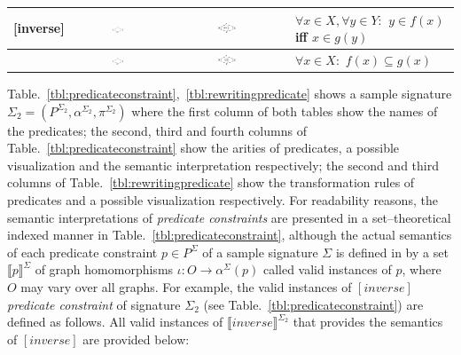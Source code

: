 \documentclass{eceasst}
\begin{document}
\begin{table}[h]
\begin{center}
\begin{tabular}{| l | c | c | p{6cm} | }
    [inverse] & \includegraphics[width=0.13\textwidth]{inv_1.pdf} & \includegraphics[width=0.16\textwidth]{inv_vis.pdf} & $\forall x \in X, \forall y \in Y :$  $y \in f(x)$ iff $x \in g(y) $  \\ \hline 
    [image-inclusion] & \includegraphics[width=0.13\textwidth]{img_1.pdf} & \includegraphics[width=0.16\textwidth]{img_vis.pdf} & $\forall x \in X :$  $f(x) \subseteq g(x) $  \\     
    \hline    
    \end{tabular}
    \end{center}
\end{table}
\normalsize






Table.~\ref{tbl:predicateconstraint},~\ref{tbl:rewritingpredicate} shows a sample signature $\Sigma_2 = (P^{\Sigma_2}, \alpha^{\Sigma_2}, \pi^{\Sigma_2})$ where the first column of 
both tables show the names of the predicates; the second, third and fourth columns of Table.~\ref{tbl:predicateconstraint} show the arities of predicates, a possible visualization 
and the semantic interpretation respectively; the second and third columns of Table.~\ref{tbl:rewritingpredicate} show the transformation rules of predicates and a possible visualization respectively.
For readability reasons, the semantic interpretations of \textit{predicate constraints} are presented in a set--theoretical indexed manner in Table.~\ref{tbl:predicateconstraint}, 
although the actual semantics of each predicate constraint $p \in P^{\Sigma}$ of a sample signature $\Sigma$ is defined in \cite{Rutle10} by a set $\llbracket p \rrbracket^{\Sigma}$ of 
graph homomorphisms $\iota : O \rightarrow \alpha^{\Sigma}(p)$ called valid instances of $p$, where $O$ may vary over all graphs. 
For example, the valid instances of $[inverse]$ \textit{predicate constraint} of signature $\Sigma_2$ (see Table.~\ref{tbl:predicateconstraint}) are defined as follows. 
All valid instances of $\llbracket inverse \rrbracket^{\Sigma_2}$ that provides the semantics of $[inverse]$ are provided below: 
\end{document}
